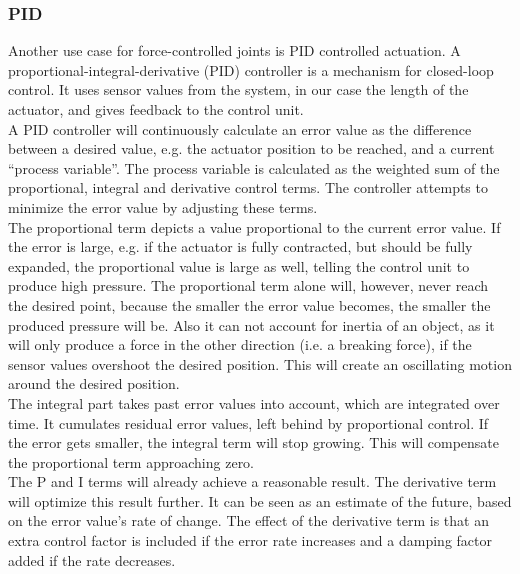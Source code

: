 \subsubsection{PID}\label{sec:pid}
Another use case for force-controlled joints is PID controlled actuation. A proportional-integral-derivative (PID) controller is a mechanism for closed-loop control. It uses sensor values from the system, in our case the length of the actuator, and gives feedback to the control unit.\\
A PID controller will continuously calculate an error value as the difference between a desired value, e.g. the actuator position to be reached, and a current ``process variable''. The process variable is calculated as the weighted sum of the proportional, integral and derivative control terms. The controller attempts to minimize the error value by adjusting these terms.\\
The proportional term depicts a value proportional to the current error value. If the error is large, e.g. if the actuator is fully contracted, but should be fully expanded, the proportional value is large as well, telling the control unit to produce high pressure. The proportional term alone will, however, never reach the desired point, because the smaller the error value becomes, the smaller the produced pressure will be. Also it can not account for inertia of an object, as it will only produce a force in the other direction (i.e. a breaking force), if the sensor values overshoot the desired position. This will create an oscillating motion around the desired position.\\
The integral part takes past error values into account, which are integrated over time. It cumulates residual error values, left behind by proportional control. If the error gets smaller, the integral term will stop growing. This will compensate the proportional term approaching zero.\\
The P and I terms will already achieve a reasonable result. The derivative term will optimize this result further. It can be seen as an estimate of the future, based on the error value's rate of change. The effect of the derivative term is that an extra control factor is included if the error rate increases and a damping factor added if the rate decreases.

